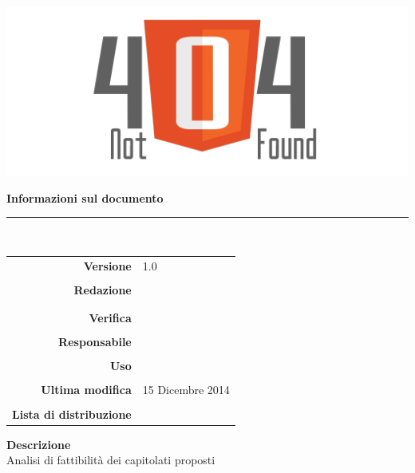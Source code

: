 \thispagestyle{empty}

\begin{titlepage}
	\begin{center}
	\begin{Huge}
		\textbf{\gruppo} \\
	\end{Huge}
	\vspace{0.5cm}
	\begin{Large}
		\textbf{\capitolato}
	\end{Large}
	
	\vspace{1cm}
    
	\includegraphics[scale=0.35]{../logo/logo404_Extends.png}
	\vspace{1cm}
	\begin{Huge}
		\textbf{\titDoc}
	\end{Huge}
	
	\vspace{1cm}
	\textbf{Informazioni sul documento}\\
    \rule{10cm}{.4pt} \\
	\begin{table}[h]
	\begin{center}
	\begin{tabular}{r | l}
		\textbf{Versione} & 1.0 \\ \\
		\textbf{Redazione} & \CaMa \\
			& \MaMo \\ \\
		\textbf{Verifica} &\GoIs \\ \\
		\textbf{Responsabile} & \VeFe \\ \\
		\textbf{Uso} & \uso \\ \\
		\textbf{Ultima modifica} & 15 Dicembre 2014 \\ \\
		\textbf{Lista di distribuzione} & \gruppo \\ 
	\end{tabular}
	\end{center}
	\end{table}
			\textbf{Descrizione} \\
			Analisi di fattibilità dei capitolati proposti
	\end{center}
\end{titlepage}